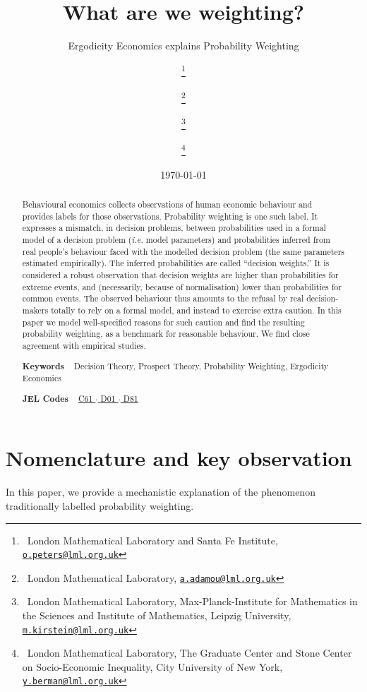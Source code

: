 \documentclass[%
	11pt,
	abstract=true,	
	bibliography=oldstyle					%
]{scrartcl}
\title{What are we weighting?}
\subtitle{Ergodicity Economics explains Probability Weighting}
\author{
	\person{Ole Peters}\footnote{~London Mathematical Laboratory and Santa Fe Institute, \texttt{\href{mailto:o.peters@lml.org.uk}{o.peters@lml.org.uk}}}
	\and \person{Alexander Adamou}\footnote{~London Mathematical Laboratory, \texttt{\href{mailto:a.adamou@lml.org.uk}{a.adamou@lml.org.uk}}}
	\and \person{Mark Kirstein}\footnote{~London Mathematical Laboratory, Max-Planck-Institute for Mathematics in the Sciences and Institute of Mathematics, Leipzig University, \texttt{\href{mailto:m.kirstein@lml.org.uk}{m.kirstein@lml.org.uk}}}
	\and
	\person{Yonatan Berman}\footnote{~London Mathematical Laboratory, The Graduate Center and Stone Center on Socio-Economic Inequality, City University of New York, \texttt{\href{mailto:y.berman@lml.org.uk}{y.berman@lml.org.uk}}} 
}
\date{\today}
\newcommand{\ie}{\textit{i.e.}\xspace}
\newcommand{\red}[1]{\textcolor{red} {#1}}
\newcommand{\bc}{\begin{center}}
\newcommand{\ec}{\end{center}}
\numberwithin{equation}{section}
\begin{document}
\begin{titlepage}
	\maketitle

\begin{abstract}
\noindent 
Behavioural economics collects observations of human economic behaviour and provides labels for those observations. 
Probability weighting is one such label. It expresses a mismatch, in decision problems, between probabilities used in a formal model of a decision problem (\ie model parameters) and probabilities inferred from real people's behaviour faced with the modelled decision problem (the same parameters estimated empirically). The inferred probabilities are called ``decision weights.'' 
It is considered a robust observation that decision weights are higher than probabilities for extreme events, and (necessarily, because of normalisation) lower than probabilities for common events.
The observed behaviour thus amounts to the refusal by real decision-makers totally to rely on a formal model, and instead to exercise extra caution. In this paper we model well-specified reasons for such caution and find the resulting probability weighting, as a benchmark for reasonable behaviour. We find close agreement with empirical studies.

\vspace{1em}

\noindent\textsf{\textbf{Keywords}} ~ Decision Theory, Prospect Theory, Probability Weighting, Ergodicity Economics
\vspace{.5em}

\noindent\textsf{\textbf{JEL Codes}} ~
\href{https://www.aeaweb.org/econlit/jelCodes.php?view=jel#C}{%
C61		%
$\cdot$
}%
\href{https://www.aeaweb.org/econlit/jelCodes.php?view=jel#D}{%
D01 	%
$\cdot$
D81 	%
}
\end{abstract}
\end{titlepage}

\section{Nomenclature and key observation}
In this paper, we provide a mechanistic explanation of the phenomenon traditionally labelled probability weighting.
\end{document}
